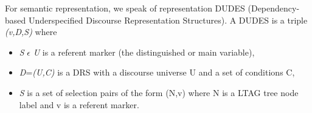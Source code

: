 For semantic representation, we speak of representation DUDES (Dependency-based Underspecified Discourse Representation Structures).
A DUDES is a triple  \textit{(v,D,S)} where 
\begin{itemize} 
  \item  \textit{S} \begin{math}\epsilon \end{math} \textit{U} is a referent marker (the distinguished or main variable),
  \item \textit{D}=\textit{(U,C)} is a DRS with a discourse universe U and a set of conditions C, 
  \item  \textit{S} is a set of selection pairs of the form (N,v) where N is a LTAG tree node label and v is
a referent marker.
\end{itemize} 